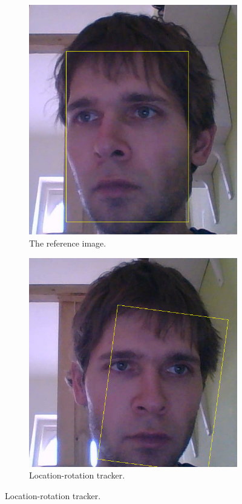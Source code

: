 \begin{figure}[t]
	\centering 
	\begin{subfigure}[b]{0.55\textwidth}
		\centering \includegraphics[width=\linewidth]{img/res-face-ref.png} \caption{The reference image.} \label{i:res-face-ref}
	\end{subfigure}
	\begin{subfigure}[b]{0.49\textwidth}
		\centering \includegraphics[width=\linewidth]{img/res-face-locrot.png} \caption{Location-rotation tracker.} \label{i:res-face-locrot}

\end{subfigure}
\end{figure}
